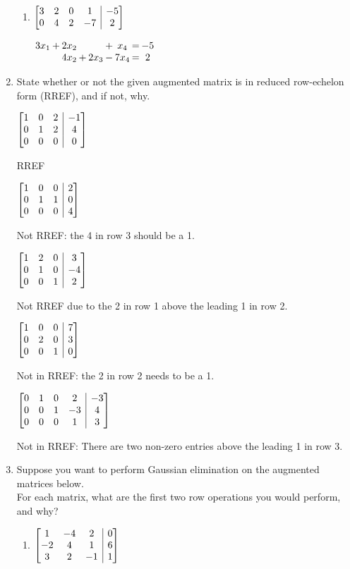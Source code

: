 \documentclass[12pt]{article}
\makeatletter
\newenvironment{amatrix}[1]{%
  \left[\begin{array}{@{}*{#1}{c}|c@{}}
}{%
  \end{array}\right]
}
\newcommand{\bam}{\begin{amatrix}}
\newcommand{\eam}{\end{amatrix}}
\makeatother
\begin{document}
\begin{enumerate}
\begin{multicols}{2}
\begin{enumerate}
 \item $\bam{4}3&2&0&1&-5\\0&4&2&-7&2\eam$
 
\medskip

 $\arraycolsep1pt\begin{array}{ccccccccc}
 3x_1&+&2x_2& & &+&x_4&=&-5\\ & &4x_2&+&2x_3&-&7x_4&=&2\end{array}$
\end{enumerate}
\end{multicols}

\bigskip

\item State whether or not the given augmented matrix is in reduced row-echelon form (RREF), and if not, why.
\begin{multicols}{5}
$\bam{3}1&0&2&-1\\0&1&2&4\\0&0&0&0\eam$

RREF\columnbreak

$\bam{3}1&0&0&2\\0&1&1&0\\0&0&0&4\eam$

Not RREF: the 4 in row 3 should be a 1.\columnbreak

$\bam{3}1&2&0&3\\0&1&0&-4\\0&0&1&2\eam$

Not RREF due to the 2 in row 1 above the leading 1 in row 2.\columnbreak

$\bam{3}1&0&0&7\\0&2&0&3\\0&0&1&0\eam$

Not in RREF: the 2 in row 2 needs to be a 1.\columnbreak

$\bam{4}0&1&0&2&-3\\0&0&1&-3&4\\0&0&0&1&3\eam$

Not in RREF: There are two non-zero entries above the leading 1 in row 3.
\end{multicols}

\pagebreak

\item Suppose you want to perform Gaussian elimination on the augmented matrices below. \\For each matrix, what are the first two row operations you would perform, and why?

\begin{enumerate}
\item $\bam{3} 1&-4&2&0\\-2&4&1&6\\3&2&-1&1\eam$


\end{enumerate}
\end{enumerate}
\end{document}
